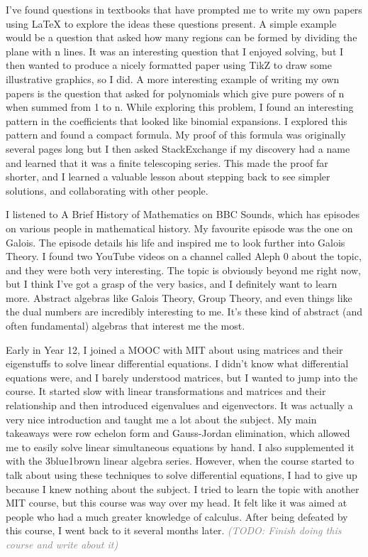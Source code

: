 \documentclass[a4paper, 12pt]{article}
\newcommand{\todo}[1]{\textsl{\textcolor{gray}{(TODO: #1)}}}
\newenvironment{personalstatement}{\directlua{startPersonalStatement()}}{\directlua{stopPersonalStatement()}}
\begin{document}
\begin{personalstatement}
I've found questions in textbooks that have prompted me to write my own papers using LaTeX to explore the ideas these questions present. A simple example would be a question that asked how many regions can be formed by dividing the plane with n lines. It was an interesting question that I enjoyed solving, but I then wanted to produce a nicely formatted paper using TikZ to draw some illustrative graphics, so I did. A more interesting example of writing my own papers is the question that asked for polynomials which give pure powers of n when summed from 1 to n. While exploring this problem, I found an interesting pattern in the coefficients that looked like binomial expansions. I explored this pattern and found a compact formula. My proof of this formula was originally several pages long but I then asked StackExchange if my discovery had a name and learned that it was a finite telescoping series. This made the proof far shorter, and I learned a valuable lesson about stepping back to see simpler solutions, and collaborating with other people.

I listened to A Brief History of Mathematics on BBC Sounds, which has episodes on various people in mathematical history. My favourite episode was the one on Galois. The episode details his life and inspired me to look further into Galois Theory. I found two YouTube videos on a channel called Aleph 0 about the topic, and they were both very interesting. The topic is obviously beyond me right now, but I think I've got a grasp of the very basics, and I definitely want to learn more. Abstract algebras like Galois Theory, Group Theory, and even things like the dual numbers are incredibly interesting to me. It's these kind of abstract (and often fundamental) algebras that interest me the most.

Early in Year 12, I joined a MOOC with MIT about using matrices and their eigenstuffs to solve linear differential equations. I didn't know what differential equations were, and I barely understood matrices, but I wanted to jump into the course. It started slow with linear transformations and matrices and their relationship and then introduced eigenvalues and eigenvectors. It was actually a very nice introduction and taught me a lot about the subject. My main takeaways were row echelon form and Gauss-Jordan elimination, which allowed me to easily solve linear simultaneous equations by hand. I also supplemented it with the 3blue1brown linear algebra series. However, when the course started to talk about using these techniques to solve differential equations, I had to give up because I knew nothing about the subject. I tried to learn the topic with another MIT course, but this course was way over my head. It felt like it was aimed at people who had a much greater knowledge of calculus. After being defeated by this course, I went back to it several months later. \todo{Finish doing this course and write about it}


\end{personalstatement}
\end{document}
